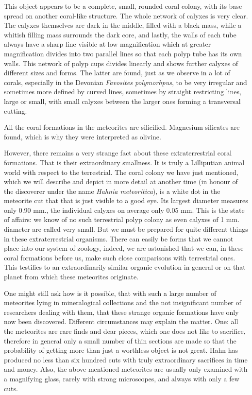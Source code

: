 \documentclass[a4paper, 12pt, oneside]{article}
\begin{document}
This object appears to be a complete, small, rounded coral colony, with its base spread on another coral-like structure. The whole network of calyxes is very clear. The calyxes themselves are dark in the middle, filled with a black mass, while a whitish filling mass surrounds the dark core, and lastly, the walls of each tube always have a sharp line visible at low magnification which at greater magnification divides into two parallel lines so that each polyp tube has its own walls. This network of polyp cups divides linearly and shows further calyxes of different sizes and forms. The latter are found, just as we observe in a lot of corals, especially in the Devonian \emph{Favosites polymorhpus}, to be very irregular and sometimes more defined by curved lines, sometimes by straight restricting lines, large or small, with small calyxes between the larger ones forming a transversal cutting.

All the coral formations in the meteorites are silicified. Magnesium silicates are found, which is why they were interpreted as olivine.

However, there remains a very strange fact about these extraterrestrial coral formations. That is their extraordinary smallness. It is truly a Lilliputian animal world with respect to the terrestrial. The coral colony we have just mentioned, which we will describe and depict in more detail at another time (in honour of the discoverer under the name \emph{Hahnia meteoritica}), is a white dot in the meteorite cut that that is just visible to a good eye. Its largest diameter measures only 0.90 mm., the individual calyxes on average only 0.05 mm. This is the state of affairs: we know of no such terrestrial polyp colony as even calyxes of 1 mm. diameter are called very small. But we must be prepared for quite different things in these extraterrestrial organisms. There can easily be forms that we cannot place into our system of zoology, indeed, we are astonished that we can, in these coral formations before us, make such close comparisons with terrestrial ones. This testifies to an extraordinarily similar organic evolution in general or on that planet from which these meteorites originate.

One might still ask how is it possible, that with such a large number of meteorites lying in mineralogical collections and the not insignificant number of researchers dealing with them, that these strange organic formations have only now been discovered. Different circumstances may explain the matter. One: all the meteorites are rare finds and dear pieces, which one does not like to sacrifice, therefore in general only a small number of thin sections are made so that the probability of getting more than just a worthless object is not great. Hahn has produced no less than six hundred cuts with truly extraordinary sacrifices in time and money. Also, the above-mentioned meteorites are usually only examined with a magnifying glass, rarely with strong microscopes, and always with only a few cuts.
\end{document}
